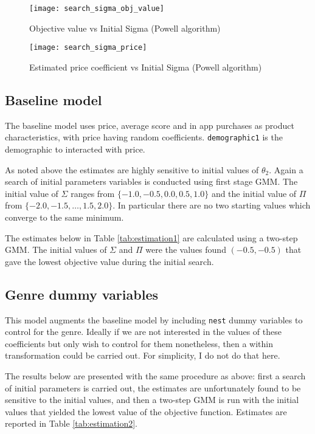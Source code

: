 \documentclass[parskip=half]{scrartcl}
\newcommand{\code}[1]{\texttt{#1}}
\begin{document}
\begin{figure}[ht]
	\centering
	\texttt{[image: search\_sigma\_obj\_value]}
	\caption{Objective value vs Initial Sigma (Powell algorithm)}
	\label{fig:search_sigma_obj_value}
\end{figure}

\begin{figure}[ht]
	\centering
	\texttt{[image: search\_sigma\_price]}
	\caption{Estimated price coefficient vs Initial Sigma (Powell algorithm)}
	\label{fig:search_sigma_price}
\end{figure}

\subsection{Baseline model}

The baseline model uses price, average score and in app purchases as product characteristics, with price having random coefficients. \code{demographic1} is the demographic to interacted with price.

As noted above the estimates are highly sensitive to initial values of \(\theta_2\). Again a search of initial parameters variables is conducted using first stage GMM. The initial value of \(\Sigma\) ranges from \(\{-1.0, -0.5, 0.0, 0.5, 1.0\}\) and the initial value of \(\Pi\) from \(\{-2.0, -1.5, \dots, 1.5, 2.0\}\). In particular there are no two starting values which converge to the same minimum.

The estimates below in Table \ref{tab:estimation1} are calculated using a two-step GMM. The initial values of \(\Sigma\) and \(\Pi\) were the values found \((-0.5, -0.5)\) that gave the lowest objective value during the initial search.



\subsection{Genre dummy variables}

This model augments the baseline model by including \code{nest} dummy variables to control for the genre. Ideally if we are not interested in the values of these coefficients but only wish to control for them nonetheless, then a within transformation could be carried out. For simplicity, I do not do that here.

The results below are presented with the same procedure as above: first a search of initial parameters is carried out, the estimates are unfortunately found to be sensitive to the initial values, and then a two-step GMM is run with the initial values that yielded the lowest value of the objective function. Estimates are reported in Table \ref{tab:estimation2}.
\end{document}

